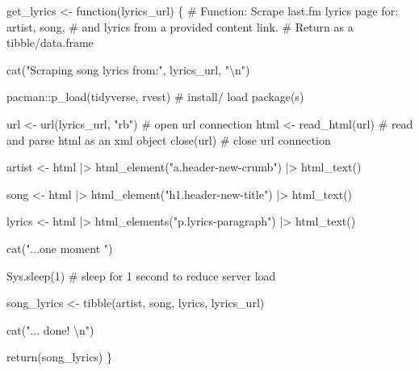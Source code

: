 \documentclass[
  letterpaper,
]{latex/krantz}
\newenvironment{Shaded}{\begin{snugshade}}{\end{snugshade}}
\newcommand{\CommentTok}[1]{\textcolor[rgb]{0.37,0.37,0.37}{#1}}
\newcommand{\ControlFlowTok}[1]{\textcolor[rgb]{0.00,0.23,0.31}{#1}}
\newcommand{\DecValTok}[1]{\textcolor[rgb]{0.68,0.00,0.00}{#1}}
\newcommand{\FunctionTok}[1]{\textcolor[rgb]{0.28,0.35,0.67}{#1}}
\newcommand{\NormalTok}[1]{\textcolor[rgb]{0.00,0.23,0.31}{#1}}
\newcommand{\OtherTok}[1]{\textcolor[rgb]{0.00,0.23,0.31}{#1}}
\newcommand{\SpecialCharTok}[1]{\textcolor[rgb]{0.37,0.37,0.37}{#1}}
\newcommand{\StringTok}[1]{\textcolor[rgb]{0.13,0.47,0.30}{#1}}
\begin{document}
\begin{Shaded}
\begin{Highlighting}[]
\NormalTok{get\_lyrics }\OtherTok{\textless{}{-}} \ControlFlowTok{function}\NormalTok{(lyrics\_url) \{}
  \CommentTok{\# Function: Scrape last.fm lyrics page for: artist, song, }
  \CommentTok{\# and lyrics from a provided content link. }
  \CommentTok{\# Return as a tibble/data.frame}
  
  \FunctionTok{cat}\NormalTok{(}\StringTok{"Scraping song lyrics from:"}\NormalTok{, lyrics\_url, }\StringTok{"}\SpecialCharTok{\textbackslash{}n}\StringTok{"}\NormalTok{)}
  
\NormalTok{  pacman}\SpecialCharTok{::}\FunctionTok{p\_load}\NormalTok{(tidyverse, rvest) }\CommentTok{\# install/ load package(s)}
  
\NormalTok{  url }\OtherTok{\textless{}{-}} \FunctionTok{url}\NormalTok{(lyrics\_url, }\StringTok{"rb"}\NormalTok{) }\CommentTok{\# open url connection }
\NormalTok{  html }\OtherTok{\textless{}{-}} \FunctionTok{read\_html}\NormalTok{(url) }\CommentTok{\# read and parse html as an xml object}
  \FunctionTok{close}\NormalTok{(url) }\CommentTok{\# close url connection}
  
\NormalTok{  artist }\OtherTok{\textless{}{-}} 
\NormalTok{    html }\SpecialCharTok{|\textgreater{}} 
    \FunctionTok{html\_element}\NormalTok{(}\StringTok{"a.header{-}new{-}crumb"}\NormalTok{) }\SpecialCharTok{|\textgreater{}} 
    \FunctionTok{html\_text}\NormalTok{()}
  
\NormalTok{  song }\OtherTok{\textless{}{-}} 
\NormalTok{    html }\SpecialCharTok{|\textgreater{}} 
    \FunctionTok{html\_element}\NormalTok{(}\StringTok{"h1.header{-}new{-}title"}\NormalTok{) }\SpecialCharTok{|\textgreater{}} 
    \FunctionTok{html\_text}\NormalTok{()}
  
\NormalTok{  lyrics }\OtherTok{\textless{}{-}} 
\NormalTok{    html }\SpecialCharTok{|\textgreater{}} 
    \FunctionTok{html\_elements}\NormalTok{(}\StringTok{"p.lyrics{-}paragraph"}\NormalTok{) }\SpecialCharTok{|\textgreater{}} 
    \FunctionTok{html\_text}\NormalTok{()}
  
  \FunctionTok{cat}\NormalTok{(}\StringTok{"...one moment "}\NormalTok{)}
  
  \FunctionTok{Sys.sleep}\NormalTok{(}\DecValTok{1}\NormalTok{) }\CommentTok{\# sleep for 1 second to reduce server load}
  
\NormalTok{  song\_lyrics }\OtherTok{\textless{}{-}} \FunctionTok{tibble}\NormalTok{(artist, song, lyrics, lyrics\_url)}
  
  \FunctionTok{cat}\NormalTok{(}\StringTok{"... done! }\SpecialCharTok{\textbackslash{}n}\StringTok{"}\NormalTok{)}
  
  \FunctionTok{return}\NormalTok{(song\_lyrics)}
\NormalTok{\}}
\end{Highlighting}
\end{Shaded}
\end{document}
